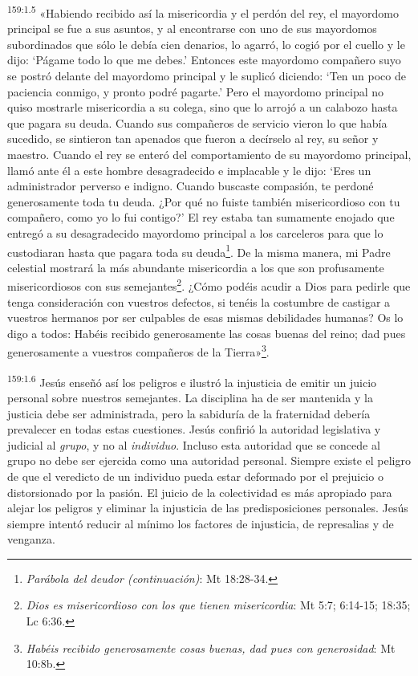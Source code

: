 \par
\textsuperscript{159:1.5} «Habiendo recibido así la misericordia y el perdón del rey, el mayordomo principal se fue a sus asuntos, y al encontrarse con uno de sus mayordomos subordinados que sólo le debía cien denarios, lo agarró, lo cogió por el cuello y le dijo: `Págame todo lo que me debes.' Entonces este mayordomo compañero suyo se postró delante del mayordomo principal y le suplicó diciendo: `Ten un poco de paciencia conmigo, y pronto podré pagarte.' Pero el mayordomo principal no quiso mostrarle misericordia a su colega, sino que lo arrojó a un calabozo hasta que pagara su deuda. Cuando sus compañeros de servicio vieron lo que había sucedido, se sintieron tan apenados que fueron a decírselo al rey, su señor y maestro. Cuando el rey se enteró del comportamiento de su mayordomo principal, llamó ante él a este hombre desagradecido e implacable y le dijo: `Eres un administrador perverso e indigno. Cuando buscaste compasión, te perdoné generosamente toda tu deuda. ¿Por qué no fuiste también misericordioso con tu compañero, como yo lo fui contigo?' El rey estaba tan sumamente enojado que entregó a su desagradecido mayordomo principal a los carceleros para que lo custodiaran hasta que pagara toda su deuda\footnote{\textit{Parábola del deudor (continuación)}: Mt 18:28-34.}. De la misma manera, mi Padre celestial mostrará la más abundante misericordia a los que son profusamente misericordiosos con sus semejantes\footnote{\textit{Dios es misericordioso con los que tienen misericordia}: Mt 5:7; 6:14-15; 18:35; Lc 6:36.}. ¿Cómo podéis acudir a Dios para pedirle que tenga consideración con vuestros defectos, si tenéis la costumbre de castigar a vuestros hermanos por ser culpables de esas mismas debilidades humanas? Os lo digo a todos: Habéis recibido generosamente las cosas buenas del reino; dad pues generosamente a vuestros compañeros de la Tierra»\footnote{\textit{Habéis recibido generosamente cosas buenas, dad pues con generosidad}: Mt 10:8b.}.

\par
\textsuperscript{159:1.6} Jesús enseñó así los peligros e ilustró la injusticia de emitir un juicio personal sobre nuestros semejantes. La disciplina ha de ser mantenida y la justicia debe ser administrada, pero la sabiduría de la fraternidad debería prevalecer en todas estas cuestiones. Jesús confirió la autoridad legislativa y judicial al \textit{grupo}, y no al \textit{individuo}. Incluso esta autoridad que se concede al grupo no debe ser ejercida como una autoridad personal. Siempre existe el peligro de que el veredicto de un individuo pueda estar deformado por el prejuicio o distorsionado por la pasión. El juicio de la colectividad es más apropiado para alejar los peligros y eliminar la injusticia de las predisposiciones personales. Jesús siempre intentó reducir al mínimo los factores de injusticia, de represalias y de venganza.

